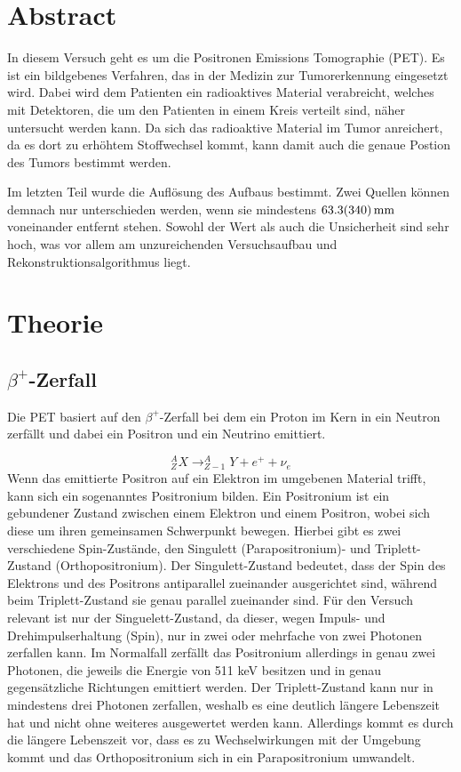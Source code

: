 \section{Abstract}
In diesem Versuch geht es um die Positronen Emissions Tomographie (PET). Es ist ein bildgebenes Verfahren, das in der Medizin zur Tumorerkennung eingesetzt wird. Dabei wird dem Patienten ein radioaktives Material verabreicht, welches mit Detektoren, die um den Patienten in einem Kreis verteilt sind, näher untersucht werden kann. Da sich das radioaktive Material im Tumor anreichert, da es dort zu erhöhtem Stoffwechsel kommt, kann damit auch die genaue Postion des Tumors bestimmt werden.

Im letzten Teil wurde die Auflösung des Aufbaus bestimmt. Zwei Quellen können demnach nur unterschieden werden, wenn sie mindestens $\SI{63,3\pm34,0}{mm}$ voneinander entfernt stehen. Sowohl der Wert als auch die Unsicherheit sind sehr hoch, was vor allem am unzureichenden Versuchsaufbau und Rekonstruktionsalgorithmus liegt.

\section{Theorie}
\subsection{$\beta^{+}$-Zerfall}
Die PET basiert auf den $\beta^{+}$-Zerfall bei dem ein Proton im Kern in ein Neutron zerfällt und dabei ein Positron und ein Neutrino emittiert.

\begin{equation}
	^{A}_{Z}X \rightarrow ^{A}_{Z-1}Y + e^{+} + \nu_{e}
\end{equation}
Wenn das emittierte Positron auf ein Elektron im umgebenen Material trifft, kann sich ein sogenanntes Positronium bilden. Ein Positronium ist ein gebundener Zustand zwischen einem Elektron und einem Positron, wobei sich diese um ihren gemeinsamen Schwerpunkt bewegen. Hierbei gibt es zwei verschiedene Spin-Zustände, den Singulett (Parapositronium)- und Triplett-Zustand (Orthopositronium). Der Singulett-Zustand bedeutet, dass der Spin des Elektrons und des Positrons antiparallel zueinander ausgerichtet sind, während beim Triplett-Zustand sie genau parallel zueinander sind. Für den Versuch relevant ist nur der Singuelett-Zustand, da dieser, wegen Impuls- und Drehimpulserhaltung (Spin), nur in zwei oder mehrfache von zwei Photonen zerfallen kann. Im Normalfall zerfällt das Positronium allerdings in genau zwei Photonen, die jeweils die Energie von 511 keV besitzen und in genau gegensätzliche Richtungen emittiert werden. Der Triplett-Zustand kann nur in mindestens drei Photonen zerfallen, weshalb es eine deutlich längere Lebenszeit hat und nicht ohne weiteres ausgewertet werden kann. Allerdings kommt es durch die längere Lebenszeit vor, dass es zu Wechselwirkungen mit der Umgebung kommt und das Orthopositronium sich in ein Parapositronium umwandelt.

